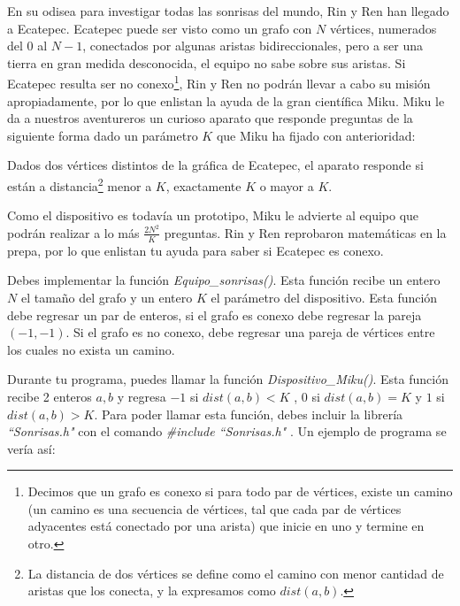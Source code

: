\documentclass[12pt]{scrartcl}
\begin{document}

    
    \vspace{10pt}

    

        En su odisea para investigar todas las sonrisas del mundo, Rin y Ren han llegado a Ecatepec. Ecatepec puede ser visto como un grafo con $N$ vértices, numerados del $0$ al $N - 1$, conectados por algunas aristas bidireccionales, pero a ser una tierra en gran medida desconocida, el equipo no sabe sobre sus aristas. Si Ecatepec resulta ser no conexo\footnote{Decimos que un grafo es conexo si para todo par de vértices, existe un camino (un camino es una secuencia de vértices, tal que cada par de vértices adyacentes está conectado por una arista) que inicie en uno y termine en otro.}, Rin y Ren no podrán llevar a cabo su misión apropiadamente, por lo que enlistan la ayuda de la gran científica Miku. Miku le da a nuestros aventureros un curioso aparato que responde preguntas de la siguiente forma dado un parámetro $K$ que Miku ha fijado con anterioridad:

        Dados dos vértices distintos de la gráfica de Ecatepec, el aparato responde si están a distancia\footnote{La distancia de dos vértices se define como el camino con menor cantidad de aristas que los conecta, y la expresamos como $dist(a, b)$.} menor a $K$, exactamente $K$ o mayor a $K$.

        Como el dispositivo es todavía un prototipo, Miku le advierte al equipo que podrán realizar a lo más $\frac{2N^2}{K}$ preguntas. Rin y Ren reprobaron matemáticas en la prepa, por lo que enlistan tu ayuda para saber si Ecatepec es conexo.
        

        

        Debes implementar la función \textit{Equipo\_sonrisas()}. Esta función recibe un entero $N$ el tamaño del grafo y un entero $K$ el parámetro del dispositivo. Esta función debe regresar un par de enteros, si el grafo es conexo debe regresar la pareja $(-1, -1)$. Si el grafo es no conexo, debe regresar una pareja de vértices entre los cuales no exista un camino. 
        
        Durante tu programa, puedes llamar la función \textit{Dispositivo\_Miku()}. Esta función recibe 2 enteros $a, b$ y regresa $-1$ si $dist(a, b) < K$ , $0$ si $dist(a, b) = K$ y $1$ si $dist(a, b) > K$.
        Para poder llamar esta función, debes incluir la librería \textit{``Sonrisas.h"} con el comando \textit{ \#include ``Sonrisas.h" }.
        Un ejemplo de programa se vería así:
\end{document}
